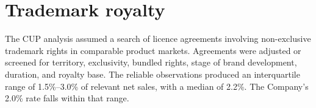 \section{Trademark royalty}
The CUP analysis assumed a search of licence agreements involving non-exclusive
trademark rights in comparable product markets. Agreements were adjusted or
screened for territory, exclusivity, bundled rights, stage of brand development,
duration, and royalty base. The reliable observations produced an interquartile
range of 1.5\%--3.0\% of relevant net sales, with a median of 2.2\%. The Company's
2.0\% rate falls within that range.
